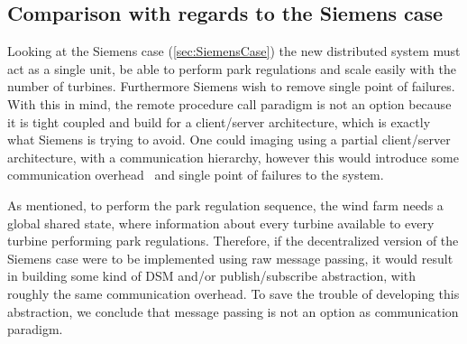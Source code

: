 %	

\subsection{Comparison with regards to the Siemens case}\label{distCompSiemensCaseComparison}

Looking at the Siemens case (\cref{sec:SiemensCase}) the new distributed system must act as a single unit, be able to perform park regulations and scale easily with the number of turbines. Furthermore Siemens wish to remove single point of failures. With this in mind, the remote procedure call paradigm is not an option because it is tight coupled and build for a client/server architecture, which is exactly what Siemens is trying to avoid. One could imaging using a partial client/server architecture, with a communication hierarchy, however this would introduce some communication overhead~\cite{Yu1997JavaDSM} and single point of failures to the system.

As mentioned, to perform the park regulation sequence, the wind farm needs a global shared state, where information about every turbine available to every turbine performing park regulations. Therefore, if the decentralized version of the Siemens case were to be implemented using raw message passing, it would result in building some kind of DSM and/or publish/subscribe abstraction, with roughly the same communication overhead. To save the trouble of developing this abstraction, we conclude that message passing is not an option as communication paradigm.

